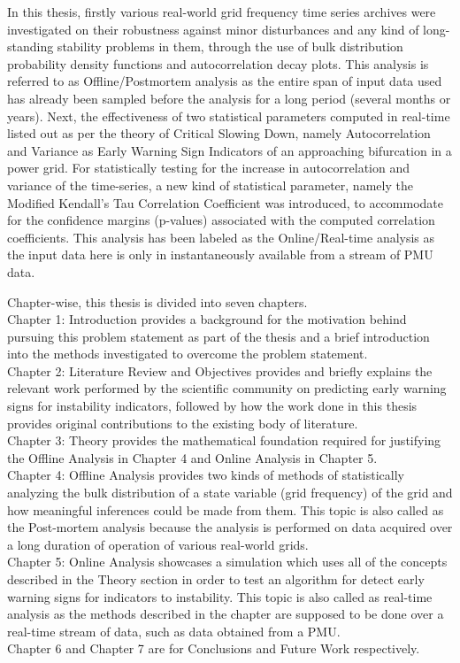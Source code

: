 In this thesis, firstly various real-world grid frequency time series archives were investigated on their robustness against minor disturbances and any kind of long-standing stability problems in them, through the use of bulk distribution probability density functions and autocorrelation decay plots. This analysis is referred to as Offline/Postmortem analysis as the entire span of input data used has already been sampled before the analysis for a long period (several months or years). Next, the effectiveness of two statistical parameters computed in real-time listed out as per the theory of Critical Slowing Down, namely Autocorrelation and Variance as Early Warning Sign Indicators of an approaching bifurcation in a power grid. For statistically testing for the increase in autocorrelation and variance of the time-series, a new kind of statistical parameter, namely the Modified Kendall's Tau Correlation Coefficient was introduced, to accommodate for the confidence margins (p-values) associated with the computed correlation coefficients. This analysis has been labeled as the Online/Real-time analysis as the input data here is only in instantaneously available from a stream of PMU data.

\noindent Chapter-wise, this thesis is divided into seven chapters.\\ Chapter 1: Introduction provides a background for the motivation behind pursuing this problem statement as part of the thesis and a brief introduction into the methods investigated to overcome the problem statement.\\
Chapter 2: Literature Review and Objectives provides and briefly explains the relevant work performed by the scientific community on predicting early warning signs for instability indicators, followed by how the work done in this thesis provides original contributions to the existing body of literature.  \\
Chapter 3: Theory provides the mathematical foundation required for justifying the Offline Analysis in Chapter 4 and  Online Analysis in Chapter 5.\\
Chapter 4: Offline Analysis provides two kinds of methods of statistically analyzing the bulk distribution of a state variable (grid frequency) of the grid and how meaningful inferences could be made from them. This topic is also called as the Post-mortem analysis because the analysis is performed on data acquired over a long duration of operation of various real-world grids.\\
Chapter 5: Online Analysis showcases a simulation which uses all of the concepts described in the Theory section in order to test an algorithm for detect early warning signs for indicators to instability. This topic is also called as real-time analysis as the methods described in the chapter are supposed to be done over a real-time stream of data, such as data obtained from a PMU.\\
Chapter 6 and Chapter 7 are for Conclusions and Future Work respectively.
